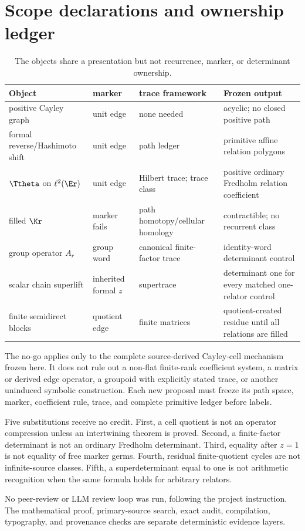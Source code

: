 \section{Scope declarations and ownership ledger}
\label{app:scope}

\begin{table}[htbp]
\centering
\small
\begin{tabularx}{\textwidth}{@{}Y L{0.17\textwidth}L{0.18\textwidth}Y@{}}
\toprule
Object & marker & trace framework & Frozen output \\
\midrule
positive Cayley graph & unit edge & none needed & acyclic; no closed positive path \\
formal reverse/Hashimoto shift & unit edge & path ledger & primitive affine relation polygons \\
$\Ttheta$ on $\ell^2(\Er)$ & unit edge & Hilbert trace; trace class & positive ordinary Fredholm relation coefficient \\
filled $\Kr$ & marker fails & path homotopy/cellular homology & contractible; no recurrent class \\
group operator $A_r$ & group word & canonical finite-factor trace & identity-word determinant control \\
scalar chain superlift & inherited formal $z$ & supertrace & determinant one for every matched one-relator control \\
finite semidirect blocks & quotient edge & finite matrices & quotient-created residue until all relations are filled \\
\bottomrule
\end{tabularx}
\caption{The objects share a presentation but not recurrence, marker, or
determinant ownership.}
\end{table}

The no-go applies only to the complete source-derived Cayley-cell mechanism
frozen here.  It does not rule out a non-flat finite-rank coefficient system,
a matrix or derived edge operator, a groupoid with explicitly stated trace, or
another uninduced symbolic construction.  Each new proposal must freeze its
path space, marker, coefficient rule, trace, and complete primitive ledger
before labels.

Five substitutions receive no credit.  First, a cell quotient is not an
operator compression unless an intertwining theorem is proved.  Second, a
finite-factor determinant is not an ordinary Fredholm determinant.  Third,
equality after $z=1$ is not equality of free marker germs.  Fourth, residual
finite-quotient cycles are not infinite-source classes.  Fifth, a
superdeterminant equal to one is not arithmetic recognition when the same
formula holds for arbitrary relators.

No peer-review or LLM review loop was run, following the project instruction.
The mathematical proof, primary-source search, exact audit, compilation,
typography, and provenance checks are separate deterministic evidence layers.
